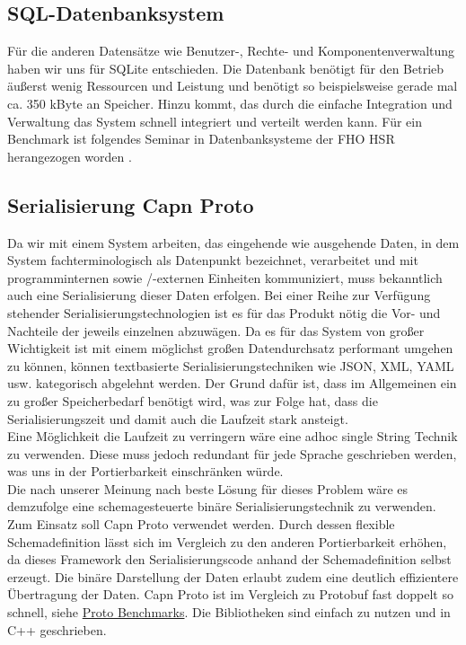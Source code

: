 \subsection{SQL-Datenbanksystem}
Für die anderen Datensätze wie Benutzer-, Rechte- und Komponentenverwaltung haben wir uns für SQLite entschieden. Die Datenbank benötigt für den Betrieb äußerst wenig Ressourcen und Leistung und benötigt so beispielsweise gerade mal ca. 350 kByte an Speicher. Hinzu kommt, das durch die einfache Integration und Verwaltung das System schnell integriert und verteilt werden kann. Für ein Benchmark ist folgendes Seminar in Datenbanksysteme der FHO HSR herangezogen worden \cite{MorierWeber2011}.
\subsection{Serialisierung Capn Proto}
Da wir mit einem System arbeiten, das eingehende wie ausgehende Daten, in dem System fachterminologisch als Datenpunkt bezeichnet, verarbeitet und mit programminternen sowie /-externen Einheiten kommuniziert, muss bekanntlich auch eine Serialisierung dieser Daten erfolgen.  Bei einer Reihe zur Verfügung stehender Serialisierungstechnologien ist es für das Produkt nötig die Vor- und Nachteile der jeweils einzelnen abzuwägen. Da es für das System von großer Wichtigkeit ist mit einem möglichst großen Datendurchsatz performant umgehen zu können, können textbasierte Serialisierungstechniken wie JSON, XML, YAML usw. kategorisch abgelehnt werden. Der Grund dafür ist, dass im Allgemeinen ein zu großer Speicherbedarf benötigt wird, was zur Folge hat, dass die Serialisierungszeit und damit auch die Laufzeit stark ansteigt.\\ 
Eine Möglichkeit die Laufzeit zu verringern wäre eine adhoc single String Technik zu verwenden. Diese muss jedoch redundant für jede Sprache geschrieben werden, was uns in der Portierbarkeit einschränken würde.\\
Die nach unserer Meinung nach beste Lösung für dieses Problem wäre es demzufolge eine schemagesteuerte binäre Serialisierungstechnik zu verwenden. Zum Einsatz soll Capn Proto verwendet werden. Durch dessen flexible Schemadefinition lässt sich im Vergleich zu den anderen Portierbarkeit erhöhen, da dieses Framework den Serialisierungscode anhand der Schemadefinition selbst erzeugt. Die binäre Darstellung der Daten erlaubt zudem eine deutlich effizientere Übertragung der Daten. Capn Proto ist im Vergleich zu Protobuf fast doppelt so schnell, siehe \href{https://github.com/ChrisMacNaughton/proto_benchmarks}{Proto Benchmarks}. Die Bibliotheken sind einfach zu nutzen und in C++ geschrieben.

